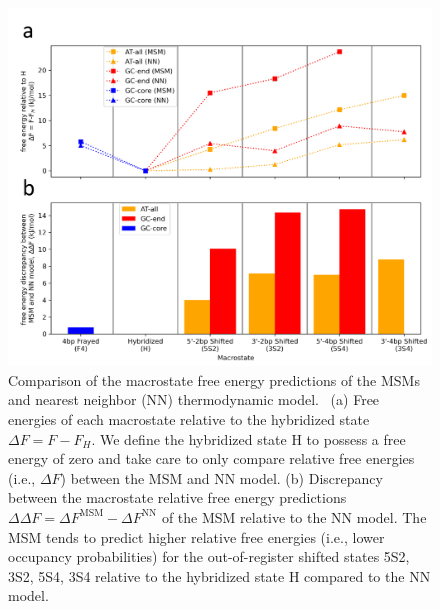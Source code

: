 \documentclass[journal=jpcbfk,manuscript=article]{achemso}
\begin{document}
\begin{figure}[ht!]
	\begin{center} 
        \includegraphics[width=160mm, scale=1]{Fig3.pdf}
        \caption{Comparison of the macrostate free energy predictions of the MSMs and nearest neighbor (NN) thermodynamic model.~\citep{SantaLucia1998AThermodynamics, Santalucia2004TheMotifs} (a) Free energies of each macrostate relative to the hybridized state $\Delta F = F - F_H$. We define the hybridized state H to possess a free energy of zero and take care to only compare relative free energies (i.e., $\Delta F$) between the MSM and NN model. (b) Discrepancy between the macrostate relative free energy predictions $\Delta \Delta F = \Delta F^\mathrm{MSM} - \Delta F^\mathrm{NN}$ of the MSM relative to the NN model. The MSM tends to predict higher relative free energies (i.e., lower occupancy probabilities) for the out-of-register shifted states 5S2, 3S2, 5S4, 3S4 relative to the hybridized state H compared to the NN model.}
        \label{fig:NN_table}
	\end{center}
\end{figure}
\end{document}
